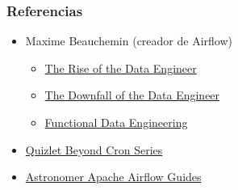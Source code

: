\documentclass[leqno, 10pt, envcountsect]{beamer}
\numberwithin{equation}{section}
\theoremstyle{definition}
\theoremstyle{example}
\numberwithin{figure}{section}
\numberwithin{table}{section}
\let\olditem\item
\renewcommand{\item}{%
\olditem\vspace{1pt}}
\begin{document}
\begin{frame}[fragile=singleslide]
  \frametitle{Referencias}
  \begin{itemize}
    \item Maxime Beauchemin (creador de Airflow)
      \begin{itemize}
        \item \href{https://www.freecodecamp.org/news/the-rise-of-the-data-engineer-91be18f1e603/}{The Rise of the Data Engineer}
        \item \href{https://medium.com/@maximebeauchemin/the-downfall-of-the-data-engineer-5bfb701e5d6b}{The Downfall of the Data Engineer}
        \item \href{https://medium.com/@maximebeauchemin/functional-data-engineering-a-modern-paradigm-for-batch-data-processing-2327ec32c42a}{Functional Data Engineering}
      \end{itemize}
    \item \href{https://medium.com/@dustinstansbury/beyond-cron-an-introduction-to-workflow-management-systems-19987afcdb5e}{Quizlet Beyond Cron Series}
    \item \href{https://www.astronomer.io/guides/}{Astronomer Apache Airflow Guides} 
  \end{itemize}
\end{frame}
\end{document}
